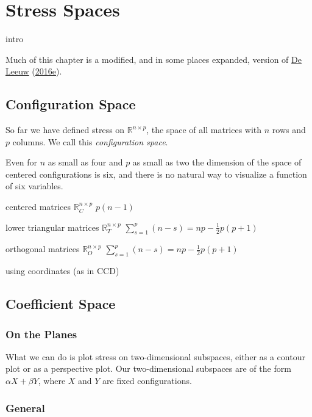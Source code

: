 \documentclass[
  12pt,
]{book}
\theoremstyle{definition}
\theoremstyle{definition}
\theoremstyle{definition}
\theoremstyle{definition}
\theoremstyle{remark}
\begin{document}
\hypertarget{propspaces}{%
\chapter{Stress Spaces}\label{propspaces}}

intro

Much of this chapter is a modified, and in some places expanded, version of \protect\hyperlink{ref-deleeuw_E_16l}{De Leeuw} (\protect\hyperlink{ref-deleeuw_E_16l}{2016e}).

\hypertarget{propconfspace}{%
\section{Configuration Space}\label{propconfspace}}

So far we have defined stress on \(\mathbb{R}^{n\times p}\), the space of all matrices with \(n\) rows and \(p\) columns. We call this \emph{configuration space}.

Even for \(n\) as small as four and \(p\) as small as two the dimension of
the space of centered configurations is six, and there is no natural way
to visualize a function of six variables.

centered matrices \(\mathbb{R}_C^{n\times p}\) \(p(n-1)\)

lower triangular matrices \(\mathbb{R}_T^{n\times p}\) \(\sum_{s=1}^p (n-s)=np-\frac12 p(p+1)\)

orthogonal matrices \(\mathbb{R}_O^{n\times p}\) \(\sum_{s=1}^p (n-s)=np-\frac12 p(p+1)\)

using coordinates (as in CCD)

\hypertarget{propcoefspace}{%
\section{Coefficient Space}\label{propcoefspace}}

\hypertarget{on-the-planes}{%
\subsection{On the Planes}\label{on-the-planes}}

What we can do is plot stress
on two-dimensional subspaces, either as a contour plot or as a perspective plot. Our two-dimensional subspaces are of the form \(\alpha X+\beta Y\), where \(X\) and \(Y\) are fixed configurations.

\hypertarget{general}{%
\subsection{General}\label{general}}
\end{document}
